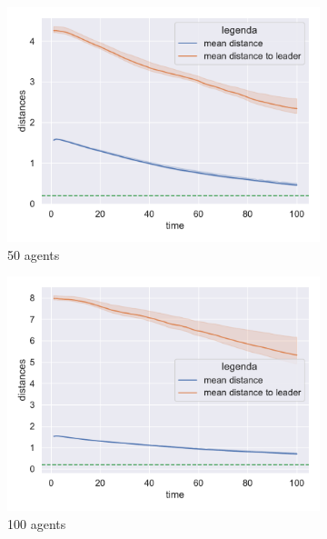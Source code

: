 \documentclass[12pt,a4paper,openright,twoside]{book}
\begin{document}
\begin{figure}[h!]
    \centering
    \begin{subfigure}[b]{0.32\textwidth}
        \centering
        \includegraphics[width=\textwidth]{figures/data-ftl-50.pdf}
        \caption{50 agents}
    \end{subfigure}
    \hfill
    \begin{subfigure}[b]{0.32\textwidth}
        \centering
        \includegraphics[width=\textwidth]{figures/data-ftl-100.pdf}
        \caption{100 agents}
    \end{subfigure}
    \hfill
    \begin{subfigure}[b]{0.32\textwidth}
        \centering

\end{subfigure}
\end{figure}
\end{document}

